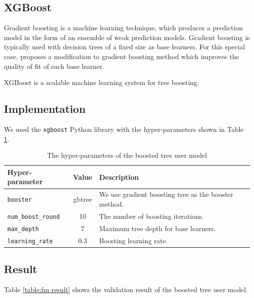     \subsection{XGBoost}

        Gradient boosting is a machine learning technique,
        which produces a prediction model in the form of an ensemble of weak prediction models.
        Gradient boosting is typically used with decision trees of a fixed size as base learners.
        For this special case, \cite{Friedman2001} proposes a modification to gradient boosting method
        which improves the quality of fit of each base learner.

        XGBoost is a scalable machine learning system for tree boosting. \cite{Chen2016}

    \subsection{Implementation}

        We used the \verb|xgboost|\cite{Chen2016} Python library
        with the hyper-parameters shown in Table \ref{table:xgboost param}.

        \begin{table}[hpbt]
        \centering
        \begin{tabular}{lcl}
            \hline
            Hyper-parameter & Value & Description \\
            \hline
            \verb|booster| & gbtree & We use gradient boosting tree as the booster method. \\
            \verb|num_boost_round| & 10 & The number of boosting iterations. \\
            \verb|max_depth| & 7 & Maximum tree depth for base learners. \\
            \verb|learning_rate| & 0.3 & Boosting learning rate. \\
            \hline
        \end{tabular}
        \caption{The hyper-parameters of the boosted tree user model}
        \label{table:xgboost param}
        \end{table}

    \subsection{Result}

        Table \ref{table:fm result} shows the validation result of the boosted tree user model.

